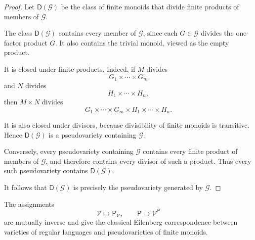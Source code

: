 \begin{proof}
    Let \(\mathsf D(\mathcal G)\) be the class of finite monoids that divide
    finite products of members of \(\mathcal G\).

    The class \(\mathsf D(\mathcal G)\) contains every member of
    \(\mathcal G\), since each \(G\in\mathcal G\) divides the one-factor
    product \(G\). It also contains the trivial monoid, viewed as the empty
    product.

    It is closed under finite products. Indeed, if \(M\) divides
    \[
        G_1\times\cdots\times G_m
    \]
    and \(N\) divides
    \[
        H_1\times\cdots\times H_n,
    \]
    then \(M\times N\) divides
    \[
        G_1\times\cdots\times G_m
        \times
        H_1\times\cdots\times H_n.
    \]

    It is also closed under divisors, because divisibility of finite monoids
    is transitive. Hence \(\mathsf D(\mathcal G)\) is a pseudovariety
    containing \(\mathcal G\).

    Conversely, every pseudovariety containing \(\mathcal G\) contains every
    finite product of members of \(\mathcal G\), and therefore contains every
    divisor of such a product. Thus every such pseudovariety contains
    \(\mathsf D(\mathcal G)\).

    It follows that \(\mathsf D(\mathcal G)\) is precisely the pseudovariety
    generated by \(\mathcal G\).
\end{proof}

\begin{theorem}
\label{thm:to-classical-eilenberg}
    The assignments
    \[
        \mathcal V
        \longmapsto
        \mathsf P_{\mathcal V},
        \qquad
        \mathsf P
        \longmapsto
        \mathcal V^{\mathsf P}
    \]
    are mutually inverse and give the classical Eilenberg correspondence
    between varieties of regular languages and pseudovarieties of finite
    monoids.
\end{theorem}

